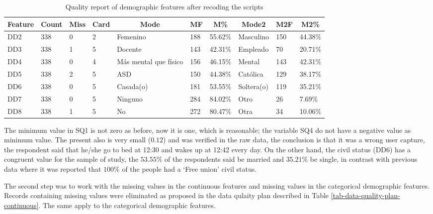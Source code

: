 \documentclass[]{book}
\begin{document}
\begin{table}[ht]
\centering
\caption{Quality report of demographic features after recoding the scripts}
\label{tab-quality-report-demographic-after-recoding-scripts}
\begin{tabular}{llllp{2cm}lllll}
\hline
\multicolumn{1}{c}{\textbf{Feature}} & \multicolumn{1}{c}{\textbf{Count}} & \multicolumn{1}{c}{\textbf{Miss}} & \multicolumn{1}{c}{\textbf{Card}} & \multicolumn{1}{c}{\textbf{Mode}} & \multicolumn{1}{c}{\textbf{MF}} & \multicolumn{1}{c}{\textbf{M\%}} & \multicolumn{1}{c}{\textbf{Mode2}} & \multicolumn{1}{c}{\textbf{M2F}} & \multicolumn{1}{c}{\textbf{M2\%}} \\ \hline
DD2   & 338  & 0   & 2    & Femenino                  & 188   & 55.62\%  & Masculino      & 150  & 44.38\%  \\
DD3   & 338  & 1   & 5    & Docente                   & 143   & 42.31\%  & Empleado       & 70   & 20.71\%  \\
DD4   & 338  & 0   & 4    & Más mental que físico     & 156   & 46.15\%  & Mental         & 143  & 42.31\%  \\
DD5   & 338  & 2   & 5    & ASD                       & 150   & 44.38\%  & Católica       & 129  & 38.17\%  \\
DD6   & 338  & 0   & 5    & Casada(o)                 & 181   & 53.55\%  & Soltera(o)     & 119  & 35.21\%  \\
DD7   & 338  & 0   & 5    & Ninguno                   & 284   & 84.02\%  & Otro           & 26   & 7.69\%   \\
DD8   & 338  & 1   & 5    & No                        & 272   & 80.47\%  & Otra           & 34   & 10.06\%  \\ \hline
\end{tabular}
\end{table}

The minimum value in SQ1 is not zero as before, now it is one, which is
reasonable; the variable SQ4 do not have a negative value as minimum
value. The present also is very small (\(0.12\)) and was verified in the
raw data, the conclusion is that it was a wrong user capture, the
respondent said that he/she go to bed at 12:30 and wakes up at 12:42
every day. On the other hand, the civil status (DD6) has a congruent
value for the sample of study, the \(53.55\%\) of the respondents said
be married and \(35.21\%\) be single, in contrast with previous data
where it was reported that \(100\%\) of the people had a `Free union'
civil status.

The second step was to work with the missing values in the continuous
features and missing values in the categorical demographic features.
Records containing missing values were eliminated as proposed in the
data qulaity plan described in Table
\ref{tab-data-quality-plan-continuous}. The same apply to the
categorical demographic features.
\end{document}
